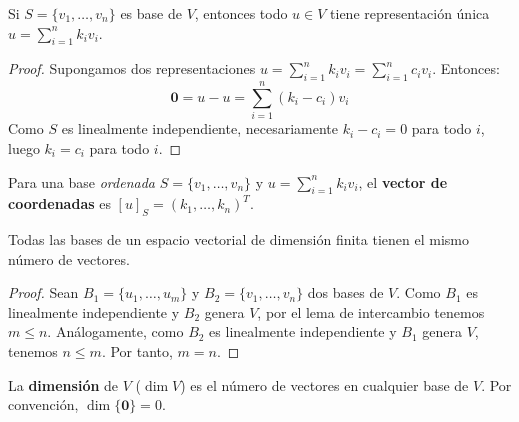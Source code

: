 \begin{theorem}\label{thm:unicidad-representacion}
Si $S = \{v_1,\dots,v_n\}$ es base de $V$, entonces todo $u \in V$ tiene representación única $u = \sum_{i=1}^n k_i v_i$.	
\begin{proof}
Supongamos dos representaciones $u = \sum_{i=1}^n k_i v_i = \sum_{i=1}^n c_i v_i$. Entonces:
$$\mathbf{0} = u - u = \sum_{i=1}^n (k_i - c_i)v_i$$
Como $S$ es linealmente independiente, necesariamente $k_i - c_i = 0$ para todo $i$, luego $k_i = c_i$ para todo $i$.
\end{proof}
\end{theorem}

\begin{definition}\label{def:vectorcoordenadas}
Para una base \textit{ordenada} $S = \{v_1,\dots,v_n\}$ y $u = \sum_{i=1}^n k_i v_i$, el \textbf{vector de coordenadas} es $[u]_S = (k_1,\dots,k_n)^T$.
\end{definition}

\begin{theorem}
Todas las bases de un espacio vectorial de dimensión finita tienen el mismo número de vectores.
\begin{proof}
Sean $B_1 = \{u_1, \ldots, u_m\}$ y $B_2 = \{v_1, \ldots, v_n\}$ dos bases de $V$. Como $B_1$ es linealmente independiente y $B_2$ genera $V$, por el lema de intercambio tenemos $m \leq n$. Análogamente, como $B_2$ es linealmente independiente y $B_1$ genera $V$, tenemos $n \leq m$. Por tanto, $m = n$.
\end{proof}
\end{theorem}

\begin{definition}[Dimensión]
La \textbf{dimensión} de $V$ ($\dim V$) es el número de vectores en cualquier base de $V$. Por convención, $\dim \{\mathbf{0}\} = 0$.
\end{definition}

